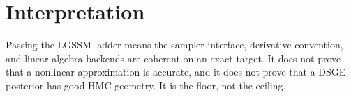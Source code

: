 \section{Interpretation}
\label{sec:bf-lgssm-interpretation}

Passing the LGSSM ladder means the sampler interface, derivative convention,
and linear algebra backends are coherent on an exact target.  It does not prove
that a nonlinear approximation is accurate, and it does not prove that a DSGE
posterior has good HMC geometry.  It is the floor, not the ceiling.
